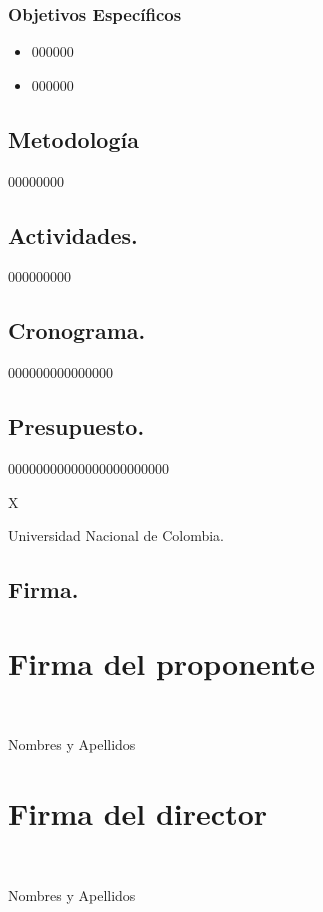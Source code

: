 \documentclass[10pt]{article}
\begin{document}
\subsection{Objetivos Específicos}
\begin{itemize}
\item 000000
\item 000000
\end{itemize}



\section{Metodología}

00000000

\section{Actividades.}
000000000


\section{Cronograma.}
000000000000000



\section{Presupuesto.}
00000000000000000000000


\begin{thebibliography}{X}

 Universidad Nacional de Colombia.
\end{thebibliography}  

\newpage
\section{Firma.}

\chapter{ \textbf{Firma del proponente }}
\\[20pt]


\makebox[2.5in]{\hrulefill} 

Nombres y Apellidos\\ 

\chapter{  \textbf{Firma del director }}
\\[20pt]

\makebox[2.5in]{\hrulefill} 

Nombres y Apellidos\\
\end{document}
